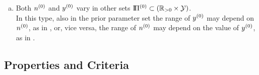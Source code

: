 \begin{enumerate}[(a)]
{but nevertheless follow the same update step.} %
We have used a model of this type in Section~\ref{sec:intervallearningparameter},
and will discuss and illustrate this approach in more detail in Section~\ref{sec:jstp}.
It should be noted here that while the prior parameter set is a Cartesian product of $\NZ = [\nzl, \nzu]$ and $\YZ$,
the posterior parameter set is not.
This is due to Eq.~\eqref{eq:canonicalupdate},
which results in different ranges for $\yn$ depending on the value of $\nz$ used in the update step.%
\footnote{This change of shape of the parameter $\PN$ set is illustrated in Figure~\ref{fig:spot-banana}, page~\pageref{fig:spot-banana}.
We discuss the phenomenon of shape change in Section~\ref{sec:ibbm-walley},
and again in Sections~\ref{sec:concluding-outlook} and \ref{sec:miksworld}.}
\item Both $\nz$ and $y^{(0)}$ vary in other sets $\text{I}\!\Pi^{(0)} \subset (\mathbb{R}_{>0} \times \mathcal{Y})$.\\
\label{enum:generalset}%
In this type, also in the prior parameter set the range of $y^{(0)}$ may depend on $\nz$,
as in \textcite[\S 2.3, see Section~\ref{sec:othershapes}]{Walter2011a},
or, vice versa, the range of $\nz$ may depend on the value of $y^{(0)}$, as in \textcite{2012:benavolizaffalon}.
\label{enum:modeltypes-d}
\end{enumerate}


\subsection{Properties and Criteria}
\label{sec:gbicp-properties-criteria}

